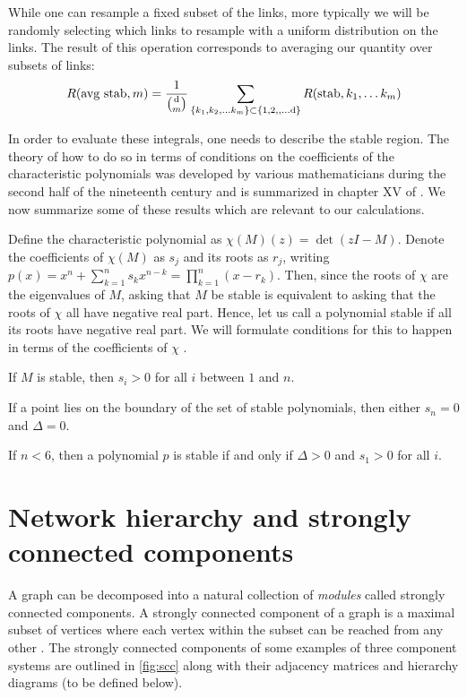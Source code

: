 While one can resample a fixed subset of the links, more typically we will be randomly selecting which links to resample with a uniform distribution on the links.  The result of this operation corresponds to averaging our quantity over subsets of links:
\begin{equation}
R (\hbox{avg stab}, m) =
\frac{1}{\binom{\mathrm{d}}{m}}
\sum_{\{k_1, k_2, \ldots k_m\} \subset \{1, 2,, \ldots \mathrm{d}\}}
R (\mathrm{stab}, k_1, \ldots k_m)
\end{equation}

In order to evaluate these integrals, one needs to describe the stable region.
The theory of how to do so in terms of conditions on the coefficients of the
characteristic polynomials was developed by various mathematicians during the
second half of the nineteenth century and is summarized in chapter XV of
\cite{Gantmacher1959}.  We now summarize some of these results which are
relevant to our calculations.

Define the characteristic polynomial as $\chi(M)(z) = \det(zI - M)$.
Denote the coefficients of $\chi(M)$ as $s_j$ and its roots as $r_j$,
writing $p(x) = x^n + \sum_{k=1}^n s_k x^{n-k} = \prod_{k=1}^n (x-r_k)$.
Then, since the roots of $\chi$ are the eigenvalues of $M$, asking that
$M$ be stable is equivalent to asking that the roots of $\chi$ all have
negative real part.  Hence, let us call a polynomial stable if all its
roots have negative real part.  We will formulate conditions for this to
happen in terms of the coefficients of $\chi$ \cite{Gantmacher1959}.

\begin{lemma}
If $M$ is stable, then $s_i > 0$ for all $i$ between $1$ and $n$.
\end{lemma}
\begin{lemma}
If a point lies on the boundary of the set of stable polynomials, then
either $s_n = 0$ and $\Delta = 0$.
\end{lemma}
\begin{lemma}
If $n < 6$, then a polynomial $p$ is stable if and only
if $\Delta > 0$ and $s_1 > 0$ for all $i$.
\end{lemma}

\section{Network hierarchy and strongly connected components}

A graph can be decomposed into a natural collection of \emph{modules} called strongly connected components. A strongly connected component of a graph is a maximal subset of vertices where each vertex within the subset can be reached from any other \cite{Cormen2009}. The strongly connected components of some examples of three component systems are outlined in \ref{fig:scc} along with their adjacency matrices and hierarchy diagrams (to be defined below).

